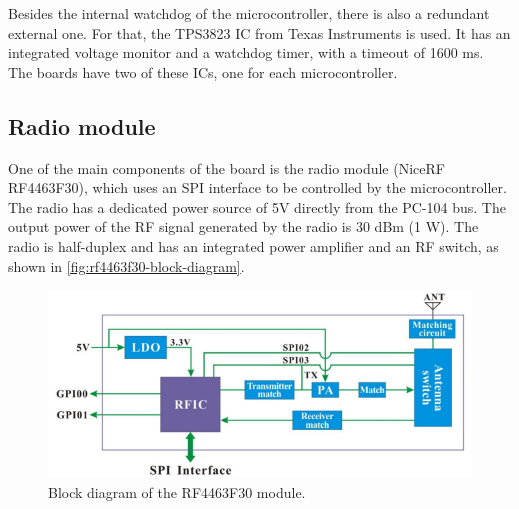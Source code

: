 Besides the internal watchdog of the microcontroller, there is also a redundant external one. For that, the TPS3823 IC from Texas Instruments is used. It has an integrated voltage monitor and a watchdog timer, with a timeout of 1600 ms. The boards have two of these ICs, one for each microcontroller.

\subsection{Radio module}

One of the main components of the board is the radio module (NiceRF RF4463F30), which uses an SPI interface to be controlled by the microcontroller. The radio has a dedicated power source of 5V directly from the PC-104 bus. The output power of the RF signal generated by the radio is 30 dBm (1 W). The radio is half-duplex and has an integrated power amplifier and an RF switch, as shown in \autoref{fig:rf4463f30-block-diagram}.

\begin{figure}[!ht]
    \begin{center}
        \includegraphics[width=\textwidth]{figures/rf4463f30-block-diagram.png}
        \caption{Block diagram of the RF4463F30 module.}
        \label{fig:rf4463f30-block-diagram}
    \end{center}
\end{figure}